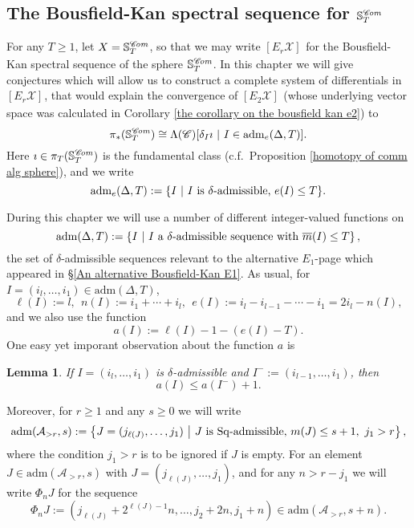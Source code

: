 \documentclass[11pt]{amsart} \renewcommand{\baselinestretch}{1.2}
\theoremstyle{plain}
\newtheorem{lem}[thm]{Lemma}
\numberwithin{equation}{section} %
\theoremstyle{plain}
\newtheorem{lem}[thm]{Lemma}
\numberwithin{equation}{chapter} %
\renewcommand{\to}{\longrightarrow}
\newcommand{\scrC}{\mathscr{C}}
\newcommand{\calA}{\mathcal{A}}
\newcommand{\calx}{\mathcal{X}}
\newcommand{\CommOperad}{{\scrC}}
\newcommand{\minDimP}{\overline{m}}
\newcommand{\minDimDelta}{m}
\newcommand{\Sq}{\mathrm{Sq}}
\newcommand{\LieSteen}{\calA}
\newcommand{\aDTnoplus}{\mathrm{adm}(\Delta,T)}
\newcommand{\aDTe}{\mathrm{adm}_{\smash{e}}(\Delta,T)}
\newcommand{\aDTm}{\mathrm{adm}_{\smash{\minDimP}}(\Delta,T)}
\newcommand{\aDTme}{\mathrm{adm}_{\smash{\minDimP\setminus e}}(\Delta,T)}
\newcommand{\aS}[2][1]{\mathrm{adm}(\LieSteen_{>#1},#2)}
\newcommand{\algs}{{\scrC\!\textit{\normalfont\textit{om}}}}
\newcommand{\E}[5]{[E^{#1}_{#2}#3]^{#4}_{#5}}
\newcommand{\SectionOrChapter}[1]{\section{\textbf{#1}}}
\begin{document}
\begin{The Bousfield-Kan spectral sequence for a sphere}
\SectionOrChapter{The Bousfield-Kan spectral sequence for $\mathbb{S}^{\algs}_T$}
\label{The Bousfield-Kan spectral sequence for a sphere}
For any $T\geq1$, let $X=\mathbb{S}^{\algs}_T$, so that we may write $\E{}{r}{\calx}{}{}$ for the Bousfield-Kan spectral sequence of the sphere $\mathbb{S}^{\algs}_T$.  In this chapter we will give conjectures which will allow us to construct a complete system of differentials in $\E{}{r}{\calx}{}{}$, that would explain the convergence of $\E{}{2}{\calx}{}{}$ (whose underlying vector space was calculated in Corollary \ref{the corollary on the bousfield kan e2}) to
\[\pi_*(\mathbb{S}^{\algs}_T)\cong \Lambda(\CommOperad)[\delta_I\imath\ |\ I\in \aDTe].\]
Here $\imath\in \pi_T(\mathbb{S}^{\algs}_T)$ is the fundamental class (c.f.\ Proposition \ref{homotopy of comm alg sphere}), and we write
\[\aDTe:=\{I\ |\ \textup{$I$ is $\delta$-admissible, $e(I)\leq T$}\}.\]

During this chapter we will use a number of different integer-valued functions on
\[\aDTnoplus:=\left\{I\ \middle|\ \textup{$I$ a $\delta$-admissible sequence with }\minDimP(I)\leq T\right\},\]
the set of $\delta$-admissible sequences relevant to the alternative $E_1$-page which appeared in \S\ref{An alternative Bousfield-Kan E1}. As usual, for $I=(i_l,\ldots,i_1)\in \aDTnoplus$,
\[\ell(I):=l,\ \ n(I):=i_1+\cdots +i_l,\ \ e(I):=i_l-i_{l-1}-\cdots -i_1=2i_l-n(I),\]
and we also use the function
\[a(I):=\ell(I)-1-(e(I)-T).\]
One easy yet imporant observation about the function $a$ is
\begin{lem}
\label{funtion a doesn't grow much}
If $I=(i_l,\ldots,i_1)$ is $\delta$-admissible and $I^{-}:=(i_{l-1},\ldots,i_1)$, then
\[a(I)\leq a(I^{-})+1.\]

\end{lem}

Moreover, for $r\geq1$ and any $s\geq0$ we will write
\[\aS[r]{s}:=\left\{J=(j_{\ell(J)},\ldots,j_1)\ \middle|\ \textup{$J$ is $\Sq$-admissible, }\minDimDelta(J)\leq s+1,\ j_1>r\right\},\]
where the condition $j_1>r$ is to be ignored if $J$ is empty.
For an element $J\in \aS[r]{s}$ with $J=(j_{\ell(J)},\ldots,j_1)$, and for any $n> r-j_1$ we will write $\Phi_nJ$ for the sequence
\[\Phi_nJ:=(j_{\ell(J)}+2^{\ell(J)-1}n,\ldots,j_2+2n,j_1+n)\in \aS[r]{s+n}.\]


\end{The Bousfield-Kan spectral sequence for a sphere}
\end{document}
